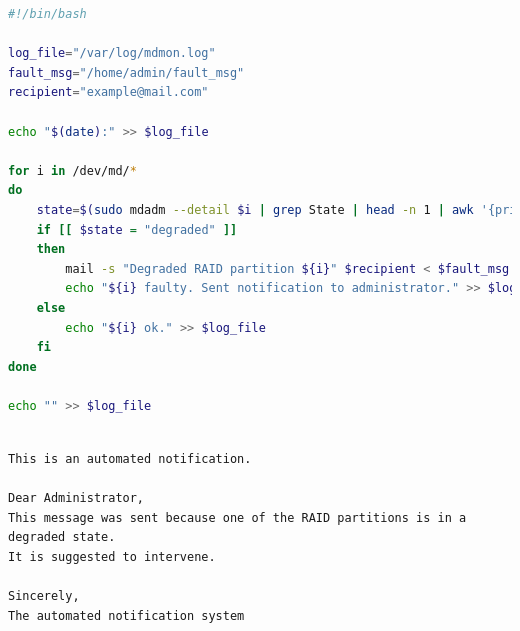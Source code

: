 \documentclass[11pt]{article}
\begin{document}
\begin{lstlisting}[language=Bash, caption={checkmd.sh}]
#!/bin/bash

log_file="/var/log/mdmon.log"
fault_msg="/home/admin/fault_msg"
recipient="example@mail.com"
    
echo "$(date):" >> $log_file
    
for i in /dev/md/*
do
    state=$(sudo mdadm --detail $i | grep State | head -n 1 | awk '{print $NF}')
    if [[ $state = "degraded" ]]
    then
        mail -s "Degraded RAID partition ${i}" $recipient < $fault_msg
        echo "${i} faulty. Sent notification to administrator." >> $log_file
    else
        echo "${i} ok." >> $log_file
    fi
done
    
echo "" >> $log_file
    
\end{lstlisting}

\begin{lstlisting}[caption={fault\_msg}]
This is an automated notification.

Dear Administrator,
This message was sent because one of the RAID partitions is in a degraded state.
It is suggested to intervene.
    
Sincerely,
The automated notification system
\end{lstlisting}
\end{document}
